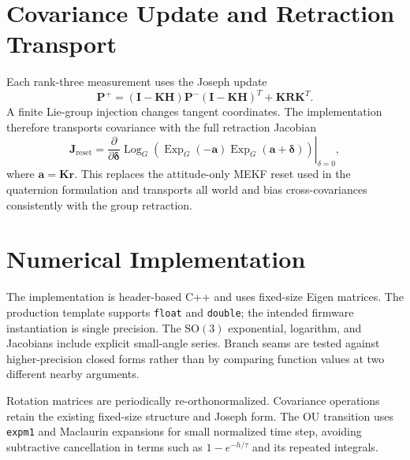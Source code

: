 \documentclass[conference]{IEEEtran}
\newcommand{\SO}{\mathrm{SO}}
\DeclareMathOperator{\Exp}{Exp}
\DeclareMathOperator{\Log}{Log}
\theoremstyle{bodysmall}
\begin{document}
\section{Covariance Update and Retraction Transport}
Each rank-three measurement uses the Joseph update
\begin{equation}
\bm{P}^+=(\bm{I}-\bm{K}\bm{H})\bm{P}^-(\bm{I}-\bm{K}\bm{H})^T+\bm{K}\bm{R}\bm{K}^T.
\end{equation}
A finite Lie-group injection changes tangent coordinates. The implementation therefore transports covariance with the full retraction Jacobian
\begin{equation}
\bm{J}_{\mathrm{reset}}=
\left.\frac{\partial}{\partial\bm{\delta}}
\Log_G\!\left(\Exp_G(-\bm{a})\Exp_G(\bm{a}+\bm{\delta})\right)
\right|_{\delta=0},
\end{equation}
where $\bm{a}=\bm{K}\bm{r}$. This replaces the attitude-only MEKF reset used in the quaternion formulation and transports all world and bias cross-covariances consistently with the group retraction.

\section{Numerical Implementation}
The implementation is header-based C++ and uses fixed-size Eigen matrices. The production template supports \texttt{float} and \texttt{double}; the intended firmware instantiation is single precision. The $\SO(3)$ exponential, logarithm, and Jacobians include explicit small-angle series. Branch seams are tested against higher-precision closed forms rather than by comparing function values at two different nearby arguments.

Rotation matrices are periodically re-orthonormalized. Covariance operations retain the existing fixed-size structure and Joseph form. The OU transition uses \texttt{expm1} and Maclaurin expansions for small normalized time step, avoiding subtractive cancellation in terms such as $1-e^{-h/\tau}$ and its repeated integrals.
\end{document}

